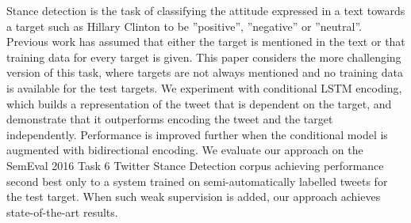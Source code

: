 Stance detection is the task of classifying the attitude  expressed in a text towards a target such as Hillary Clinton to be ''positive'', ''negative'' or ''neutral''. Previous work has assumed that either the target is mentioned in the text or that training data for every target is given. This paper considers the more challenging version of this task, where targets are not always mentioned and no training data is available for the test targets. We experiment with conditional LSTM encoding, which builds a representation of the tweet that is dependent on the target, and demonstrate that it outperforms encoding the tweet and the target independently. Performance is improved further when the conditional model is augmented with bidirectional encoding. We evaluate our approach on the SemEval 2016 Task 6 Twitter Stance Detection corpus achieving performance second best only to a system trained on semi-automatically labelled tweets for the test target. When such weak supervision is added, our approach achieves state-of-the-art results.
